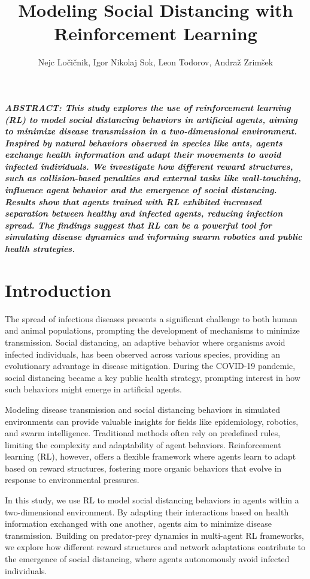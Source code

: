 \documentclass[9pt]{IEEEtran}
\title{\vspace{0ex}
Modeling Social Distancing with Reinforcement Learning}
\author{Nejc Ločičnik, Igor Nikolaj Sok, Leon Todorov, Andraž Zrimšek \vspace{-4.0ex}}
\begin{document}
\maketitle

\noindent\textit{\textbf{ABSTRACT: This study explores the use of reinforcement learning (RL) to model social distancing behaviors in artificial agents, aiming to minimize disease transmission in a two-dimensional environment. Inspired by natural behaviors observed in species like ants, agents exchange health information and adapt their movements to avoid infected individuals. We investigate how different reward structures, such as collision-based penalties and external tasks like wall-touching, influence agent behavior and the emergence of social distancing. Results show that agents trained with RL exhibited increased separation between healthy and infected agents, reducing infection spread. The findings suggest that RL can be a powerful tool for simulating disease dynamics and informing swarm robotics and public health strategies.}}

\section{Introduction}

The spread of infectious diseases presents a significant challenge to both human and animal populations, prompting the development of mechanisms to minimize transmission. Social distancing, an adaptive behavior where organisms avoid infected individuals, has been observed across various species, providing an evolutionary advantage in disease mitigation. During the COVID-19 pandemic, social distancing became a key public health strategy, prompting interest in how such behaviors might emerge in artificial agents.

Modeling disease transmission and social distancing behaviors in simulated environments can provide valuable insights for fields like epidemiology, robotics, and swarm intelligence. Traditional methods often rely on predefined rules, limiting the complexity and adaptability of agent behaviors. Reinforcement learning (RL), however, offers a flexible framework where agents learn to adapt based on reward structures, fostering more organic behaviors that evolve in response to environmental pressures.

In this study, we use RL to model social distancing behaviors in agents within a two-dimensional environment. By adapting their interactions based on health information exchanged with one another, agents aim to minimize disease transmission. Building on predator-prey dynamics in multi-agent RL frameworks, we explore how different reward structures and network adaptations contribute to the emergence of social distancing, where agents autonomously avoid infected individuals.
\end{document}
